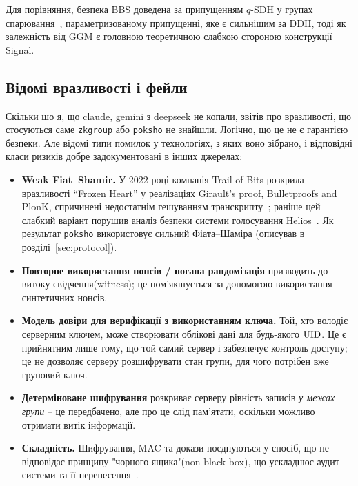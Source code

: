 Для порівняння, безпека BBS доведена за припущенням $q$-SDH у групах спарювання~\cite{TZ23}, параметризованому 
припущенні, яке є сильнішим за DDH, тоді як залежність від GGM є головною теоретичною слабкою стороною конструкції 
Signal.

\subsection{Відомі вразливості і фейли}
Скільки шо я, що claude, gemini з deepseek не копали, звітів про вразливості, що стосуються саме \texttt{zkgroup} 
або \texttt{poksho} не знайшли. Логічно, що це не є гарантією безпеки. Але відомі типи помилок у технологіях, з 
яких воно зібрано, і відповідні класи ризиків добре задокументовані в інших джерелах:

\begin{itemize}
  \item \textbf{Weak Fiat--Shamir.} У 2022 році компанія Trail of Bits розкрила вразливості \enquote{Frozen Heart} 
    у реалізаціях Girault's proof, Bulletproofs and PlonK, спричинені недостатнім гешуванням транскрипту~\cite{FrozenHeart22}; 
    раніше цей слабкий варіант порушив аналіз безпеки системи голосування Helios~\cite{BPW12}. Як результат 
    \texttt{poksho} використовує сильний Фіата–Шаміра (описував в розділі~\ref{sec:protocol}).
  \item \textbf{Повторне використання нонсів / погана рандомізація} призводить до витоку свідчення(witness); це 
    пом'якшується за допомогою використання синтетичних нонсів.
  \item \textbf{Модель довіри для верифікації з використанням ключа.} Той, хто володіє серверним ключем, може 
    створювати облікові дані для будь-якого $\mathrm{UID}$. Це є прийнятним лише тому, що той самий сервер і забезпечує 
    контроль доступу; це не дозволяє серверу розшифрувати стан групи, для чого потрібен вже груповий ключ.
  \item \textbf{Детерміноване шифрування} розкриває серверу рівність записів \emph{у межах групи} -- це передбачено, 
    але про це слід пам'ятати, оскільки можливо отримати витік інформації.
  \item \textbf{Складність.} Шифрування, MAC та докази поєднуються у спосіб, що не відповідає принципу "чорного 
    ящика"{}(non-black-box), що ускладнює аудит системи та її перенесення~\cite{Connell26}.
\end{itemize}

